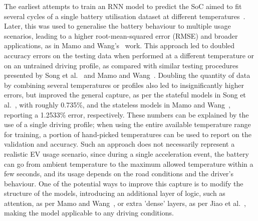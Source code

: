%
The earliest attempts to train an RNN model to predict the SoC aimed to fit several cycles of a single battery utilisation dataset at different temperatures~\cite{song_lithium-ion_2018, xiao_accurate_2019,javid_adaptive_2020, jiao_gru-rnn_2020}.
Later, this was used to generalise the battery behaviour to multiple usage scenarios, leading to a higher root-mean-squared error (RMSE) and broader applications, as in Mamo and Wang's~\cite{mamo_long_2020} work.
This approach led to doubled accuracy errors on the testing data when performed at a different temperature or on an untrained driving profile, as compared with similar testing procedures presented by Song et al.~\cite{song_lithium-ion_2018} and Mamo and Wang~\cite{mamo_long_2020}.
Doubling the quantity of data by combining several temperatures or profiles also led to insignificantly higher errors, but improved the general capture, as per the stateful models in Song et al.~\cite{song_lithium-ion_2018}, with roughly 0.735\%, and the stateless models in Mamo and Wang~\cite{mamo_long_2020}, reporting a 1.2533\% error, respectively.
These numbers can be explained by the use of a single driving profile; when using the entire available temperature range for training, a portion of hand-picked temperatures can be used to report on the validation and accuracy. %
Such an approach does not necessarily represent a realistic EV usage scenario, since during a single acceleration event, the battery can go from ambient temperature to the maximum allowed temperature within a few seconds, and its usage depends on the road conditions and the driver's behaviour.
One of the potential ways to improve this capture is to modify the structure of the models, introducing an additional layer of logic, such as attention, as per Mamo and Wang~\cite{mamo_long_2020}, or extra 'dense' layers, as per Jiao et al.~\cite{jiao_gru-rnn_2020}, making the model applicable to any driving conditions.
